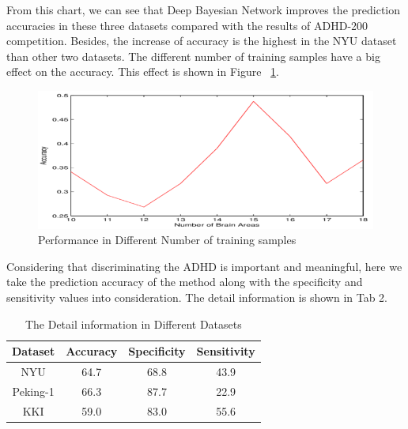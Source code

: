 \documentclass{article}
\begin{document}
From this chart, we can see that Deep Bayesian Network improves the prediction accuracies  in these three datasets  compared with the results of ADHD-200 competition. Besides, the increase of accuracy is the highest in the NYU dataset than other two datasets. The different number of training samples have a big effect on the accuracy. This effect is shown in Figure ~\ref{fig:Number}.
\begin{figure}[ht]
\begin{center}
   \includegraphics[width=0.8\linewidth]{Figures/Number.png}
\end{center}
   \caption{Performance in Different Number of training samples}
\label{fig:Number}
\end{figure}



Considering that discriminating the ADHD is important and meaningful, here we take the prediction accuracy of the method along with the specificity and sensitivity values into consideration. The detail information is shown in Tab 2.



\begin{table}[h]
\label{tab:2}
\caption{The Detail information in Different Datasets}
\begin{center}
\begin{tabular}{cccc}
\hline

Dataset  	&   Accuracy  	&	Specificity  &	Sensitivity \\
\hline
NYU			&  64.7	&  68.8 & 43.9 \\[2pt]
Peking-1		& 66.3 & 87.7 &22.9\\[2pt]
KKI			& 59.0  & 83.0  & 55.6\\[2pt]
\hline
\end{tabular}
\end{center}
\end{table}
\end{document}
